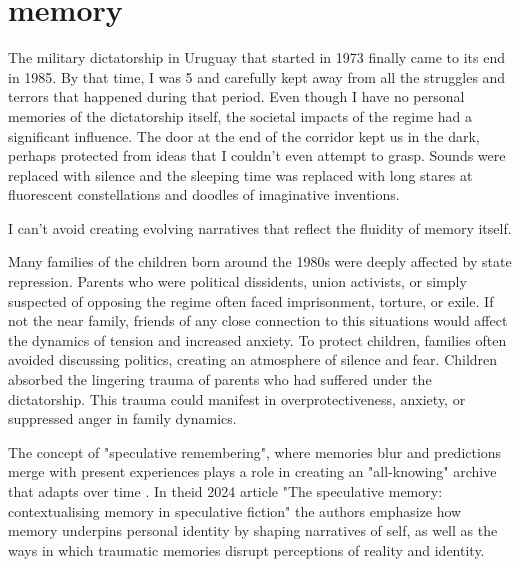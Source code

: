\chapter*{memory}
\begin{center}
\vspace{2cm}
\begin{flushright}
\large
\end{flushright}
\vspace{2cm}
\end{center}
\normalsize

The military dictatorship in Uruguay that started in 1973 finally came to its end in 1985. By that time, I was 5 and carefully kept away from all the struggles and terrors that happened during that period. Even though I have no personal memories of the dictatorship itself, the societal impacts of the regime had a significant influence. The door at the end of the corridor kept us in the dark, perhaps protected from ideas that I couldn't even attempt to grasp. Sounds were replaced with silence and the sleeping time was replaced with long stares at fluorescent constellations and doodles of imaginative inventions.    

I can't avoid creating evolving narratives that reflect the fluidity of memory itself. 

Many families of the children born around the 1980s were deeply affected by state repression. Parents who were political dissidents, union activists, or simply suspected of opposing the regime often faced imprisonment, torture, or exile. If not the near family, friends of any close connection to this situations would affect the dynamics of tension and increased anxiety. To protect children, families often avoided discussing politics, creating an atmosphere of silence and fear. Children absorbed the lingering trauma of parents who had suffered under the dictatorship. This trauma could manifest in overprotectiveness, anxiety, or suppressed anger in family dynamics.

The concept of "speculative remembering", where memories blur and predictions merge with present experiences plays a role in creating an "all-knowing" archive that adapts over time \citep{dutt2024}. In theid 2024 article "The speculative memory: contextualising memory in speculative fiction" the authors emphasize how memory underpins personal identity by shaping narratives of self, as well as the ways in which traumatic memories disrupt perceptions of reality and identity. 

